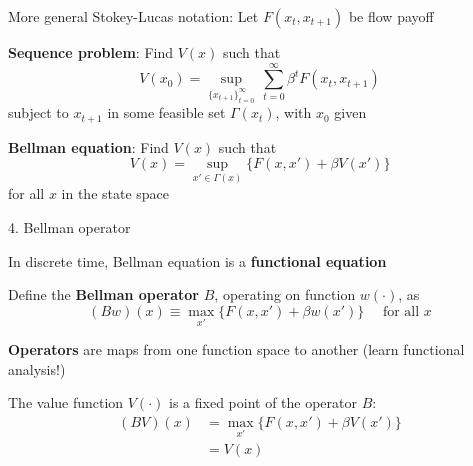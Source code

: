 \documentclass[11pt, aspectratio=169]{beamer}
\newenvironment{witemize}{\itemize\addtolength{\itemsep}{10pt}}{\enditemize}
\begin{document}
\begin{frame}{}

More general Stokey-Lucas notation: Let $F(x_t, x_{t+1})$ be flow payoff

\vspace{8mm}
\textbf{Sequence problem}: Find $V(x)$ such that 
\begin{equation*}
	V(x_0) = \sup_{ \{ x_{t+1} \}_{t=0}^\infty} \, \sum_{t=0}^\infty \beta^t F(x_t, x_{t+1})
\end{equation*}
subject to $x_{t+1}$ in some feasible set $\Gamma(x_t)$, with $x_0$ given

\vspace{8mm}
\textbf{Bellman equation}: Find $V(x)$ such that 
\begin{equation*}
	V(x) = \sup_{x' \in \Gamma(x)} \Big\{ F(x, x') + \beta V(x') \Big\}
\end{equation*}
for all $x$ in the state space

\end{frame}



\begin{frame}{4. Bellman operator}
\begin{witemize}
\item In discrete time, Bellman equation is a \textbf{functional equation}

\item Define the \textbf{Bellman operator} $B$, operating on function $w(\cdot)$, as
\begin{equation*}
	(Bw)(x) \equiv \max_{x'} \Big\{ F(x, x') + \beta w(x') \Big\} \quad \text{ for all } x
\end{equation*}

\item \textbf{Operators} are maps from one function space to another (learn functional analysis!)

\item The value function $V(\cdot)$ is a fixed point of the operator $B$:
\begin{align*}
	(BV)(x) &= \max_{x'} \Big\{ F(x, x') + \beta V(x') \Big\} \\
	&= V(x)
\end{align*}

\end{witemize}
\end{frame}
\end{document}
